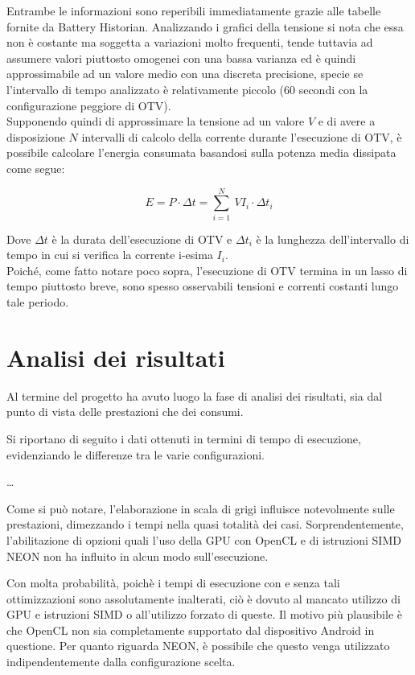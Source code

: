 Entrambe le informazioni sono reperibili immediatamente grazie alle tabelle fornite da Battery Historian.
Analizzando i grafici della tensione si nota che essa non è costante ma soggetta a variazioni molto frequenti, 
tende tuttavia ad assumere valori piuttosto omogenei con una bassa varianza ed è quindi approssimabile ad un valore medio
con una discreta precisione, specie se l'intervallo di tempo analizzato è relativamente piccolo (60 secondi con la configurazione
peggiore di OTV).\\
Supponendo quindi di approssimare la tensione ad un valore $V$ e di avere a disposizione $N$ intervalli di calcolo della
corrente durante l'esecuzione di OTV, è possibile calcolare l'energia consumata basandosi sulla potenza media dissipata come segue:

\begin{equation*}
    E = P \cdot \Delta t = \sum_{i = 1}^{N}~V I_i \cdot \Delta t_i
\end{equation*}

Dove $\Delta t$ è la durata dell'esecuzione di OTV e $\Delta t_i$ è la lunghezza dell'intervallo di tempo in cui
si verifica la corrente i-esima $I_i$.\\
Poiché, come fatto notare poco sopra, l'esecuzione di OTV termina in un lasso di tempo piuttosto breve, sono spesso osservabili
tensioni e correnti costanti lungo tale periodo.

\section{Analisi dei risultati}

Al termine del progetto ha avuto luogo la fase di analisi dei risultati, sia dal punto di vista delle prestazioni che dei 
consumi.

Si riportano di seguito i dati ottenuti in termini di tempo di esecuzione, evidenziando le differenze tra le varie configurazioni.

\ldots

Come si può notare, l'elaborazione in scala di grigi influisce notevolmente sulle prestazioni, dimezzando i tempi nella quasi
totalità dei casi. Sorprendentemente, l'abilitazione di opzioni quali l'uso della GPU con OpenCL e di istruzioni SIMD NEON non
ha influito in alcun modo sull'esecuzione. 

Con molta probabilità, poichè i tempi di esecuzione con e senza tali ottimizzazioni
sono assolutamente inalterati, ciò è dovuto al mancato utilizzo di GPU e istruzioni SIMD o all'utilizzo forzato di queste.
Il motivo più plausibile è che OpenCL non sia completamente supportato dal dispositivo Android in questione. Per quanto riguarda
NEON, è possibile che questo venga utilizzato indipendentemente dalla configurazione scelta.

